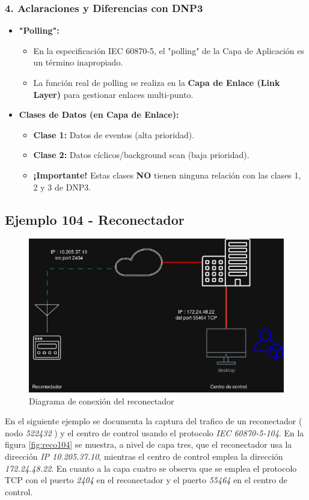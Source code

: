 \documentclass[a5paper]{book}%
\begin{document}
\subsubsection*{4. Aclaraciones y Diferencias con DNP3}
\begin{itemize}
	\item \textbf{"Polling":}
	\begin{itemize}
		\item En la especificación IEC 60870-5, el "polling" de la Capa de Aplicación es un término inapropiado.
		\item La función real de polling se realiza en la \textbf{Capa de Enlace (Link Layer)} para gestionar enlaces multi-punto.
	\end{itemize}
	\item \textbf{Clases de Datos (en Capa de Enlace):}
	\begin{itemize}
		\item \textbf{Clase 1:} Datos de eventos (alta prioridad).
		\item \textbf{Clase 2:} Datos cíclicos/background scan (baja prioridad).
		\item \textbf{¡Importante!} Estas clases \textbf{NO} tienen ninguna relación con las clases 1, 2 y 3 de DNP3.
	\end{itemize}
\end{itemize}

\subsection{Ejemplo 104 - Reconectador}

\begin{figure}[H]
	\centering
	\caption{Diagrama de conexión del reconectador}
	\label{fig:reco104diagrama}
	\includegraphics[width=0.7\linewidth]{reco_104_diagrama}
\end{figure}

En el siguiente ejemplo se documenta la captura del trafico de un reconectador ( nodo \textit{522432} ) y el centro de control usando el protocolo \textit{IEC 60870-5-104}. En la figura \ref{fig:reco104} se muestra, a nivel de capa tres, que el reconectador usa la dirección \textit{IP 10.205.37.10}, mientras el centro de control emplea la dirección \textit{172.24.48.22}. En cuanto a la capa cuatro se observa que se emplea el protocolo TCP  con el puerto \textit{2404} en el reconectador y el puerto \textit{55464} en el centro de control. 
\end{document}

